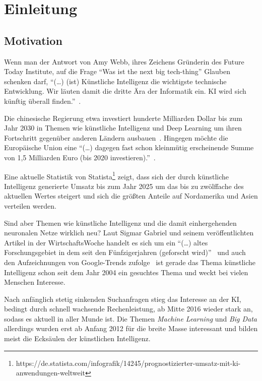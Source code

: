 \chapter{Einleitung}
\label{ch:einleitung}

\section{Motivation}
\label{sec:motivation}
Wenn man der Antwort von Amy Webb, ihres Zeichens Gründerin des Future Today Institute, auf die Frage \enquote{Was ist
the next big tech-thing} Glauben schenken darf, \enquote{(\ldots) (ist) Künstliche Intelligenz die wichtigste technische
Entwicklung. Wir läuten damit die dritte Ära der Informatik ein. KI wird sich künftig überall
finden.}~\cite{article_einleitung_dub_aw}.

Die chinesische Regierung etwa investiert hunderte Milliarden Dollar bis zum Jahr 2030 in Themen wie künstliche
Intelligenz und Deep Learning um ihren Fortschritt gegenüber anderen Ländern ausbauen~\cite{article_einleitung_css}.
Hingegen möchte die Europäische Union eine \enquote{(\ldots) dagegen fast schon kleinmütig erscheinende Summe von 1,5
Milliarden Euro (bis 2020 investieren).}~\cite{article_einleitung_ww_sg}.

Eine aktuelle Statistik von
Statista\footnote{https://de.statista.com/infografik/14245/prognostizierter-umsatz-mit-ki-anwendungen-weltweit} zeigt,
dass sich der durch künstliche Intelligenz generierte Umsatz bis zum Jahr 2025 um das bis zu zwölffache des aktuellen
Wertes steigert und sich die größten Anteile auf Nordamerika und Asien verteilen werden.

Sind aber Themen wie künstliche Intelligenz und die damit einhergehenden neuronalen Netze wirklich neu? Laut Sigmar
Gabriel und seinem veröffentlichten Artikel in der WirtschaftsWoche handelt es sich um ein \enquote{(\ldots) altes
Forschungsgebiet in dem seit den Fünfzigerjahren (geforscht wird)}~\cite{article_einleitung_ww_sg} und auch den
Aufzeichnungen von Google-Trends zufolge~\cite{online_einleitung_googletrends} ist gerade das Thema künstliche
Intelligenz schon seit dem Jahr 2004 ein gesuchtes Thema und weckt bei vielen Menschen Interesse.

Nach anfänglich stetig sinkenden Suchanfragen stieg das Interesse an der KI, bedingt durch schnell wachsende
Rechenleistung, ab Mitte 2016 wieder stark an, sodass es aktuell in aller Munde ist. Die Themen
\textit{Machine Learning} und \textit{Big Data} allerdings wurden erst ab Anfang 2012 für die breite Masse interessant
und bilden meist die Ecksäulen der künstlichen Intelligenz.

